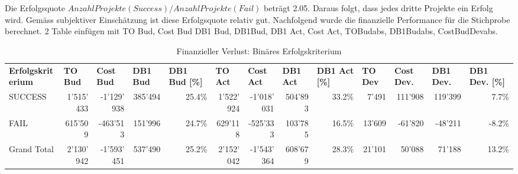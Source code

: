 \newline
Die Erfolgsquote $Anzahl Projekte (Success)/Anzahl Projekte(Fail)$ beträgt 2.05. Daraus folgt, dass jedes dritte Projekte ein Erfolg wird. Gemäss subjektiver Einschätzung ist diese Erfolgsquote relativ gut. Nachfolgend wurde die finanzielle Performance für die Stichprobe berechnet.
2 Table einfügen mit TO Bud, Cost Bud DB1 Bud, DB1Bud, DB1 Act, Cost Act, TOBudabs, DB1Budabs, CostBudDevabs.
\begin{table}[htbp]
	\centering
	\caption{Finanzieller Verlust: Binäres Erfolgskriterium }
	\begin{tabular}{lrrrrrrrrrrrr}
		\textbf{Erfolgskriterium} & \multicolumn{1}{l}{\textbf{TO Bud}} & \multicolumn{1}{l}{\textbf{Cost Bud}} & \multicolumn{1}{l}{\textbf{DB1 Bud}} & \multicolumn{1}{l}{\textbf{DB1 Bud [\%]}} & \multicolumn{1}{l}{\textbf{TO Act}} & \multicolumn{1}{l}{\textbf{Cost Act}} & \multicolumn{1}{l}{\textbf{DB1 Act}} & \multicolumn{1}{l}{\textbf{DB1 Act [\%]}} & \multicolumn{1}{l}{\textbf{TO Dev}} & \multicolumn{1}{l}{\textbf{Cost Dev.}} & \multicolumn{1}{l}{\textbf{DB1 Dev.}} & \multicolumn{1}{l}{\textbf{DB1 Dev. [\%]}} \\
		SUCCESS & 1'515'433 & -1'129'938 & 385'494 & 25.4\% & 1'522'924 & -1'018'031 & 504'893 & 33.2\% & 7'491 & 111'908 & 119'399 & 7.7\% \\
		FAIL  & 615'509 & -463'513 & 151'996 & 24.7\% & 629'118 & -525'333 & 103'785 & 16.5\% & 13'609 & -61'820 & -48'211 & -8.2\% \\
		Grand Total & 2'130'942 & -1'593'451 & 537'490 & 25.2\% & 2'152'042 & -1'543'364 & 608'679 & 28.3\% & 21'101 & 50'088 & 71'188 & 13.2\% \\
	\end{tabular}%
	\label{tab:addlabel}%
\end{table}%
